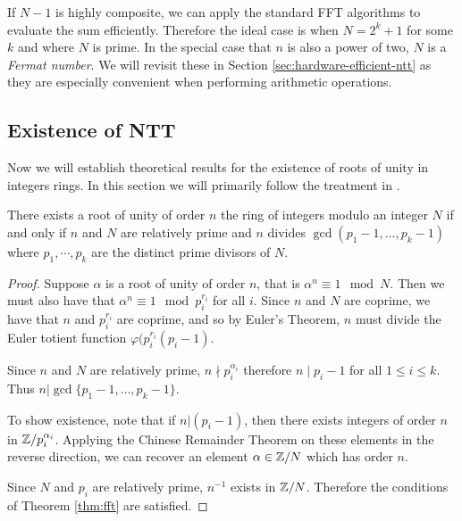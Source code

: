 If $N - 1$ is highly composite, we can apply the standard FFT algorithms to evaluate the sum efficiently. Therefore the ideal case is when $N = 2^k + 1$ for some $k$ and where $N$ is prime. In the special case that $n$ is also a power of two, $N$ is a \emph{Fermat number}. We will revisit these in Section \ref{sec:hardware-efficient-ntt} as they are especially convenient when performing arithmetic operations.

\subsection{Existence of NTT}%
\label{sub:Existence of NTT}

Now we will establish theoretical results for the existence of roots of unity in integers rings.
In this section we will primarily follow the treatment in \cite{intro-to-fmt}.

\begin{theorem}\label{thm:fmt-transform-length}

    There exists a root of unity of order $n$ the ring of integers modulo an integer $N$ if and only if $n$ and $N$ are relatively prime and $n$ divides $\gcd(p_1 - 1, \ldots, p_k - 1)$ where $p_1, \cdots, p_k$ are the distinct prime divisors of $N$.
\end{theorem}

\begin{proof}
    Suppose $\alpha$ is a root of unity of order $n$, that is $\alpha^n \equiv 1 \mod N$. Then we must also have that $\alpha^n \equiv 1 \mod p_i^{r_i}$ for all $i$. Since $n$ and $N$ are coprime, we have that $n$ and $p_i^{r_i}$ are coprime, and so by Euler's Theorem, $n$ must divide the Euler totient function $\varphi(p_i^{r_i}(p_i - 1)$.

    Since $n$ and $N$ are relatively prime, $n \nmid p_i^{\alpha_i}$ therefore $n \mid p_i - 1$ for all $1 \le i \le k$. Thus $n | \gcd\{p_1 - 1, \ldots, p_k - 1\}$.

    \medskip

    To show existence, note that if $n | (p_i - 1)$, then there exists integers of order $n$ in ${\mathbb Z}/p_i^{\alpha_i}$. Applying the Chinese Remainder Theorem on these elements in the reverse direction, we can recover an element $\alpha \in {\mathbb Z}/N$ which has order $n$.

    \medskip

    Since $N$ and $p_i$ are relatively prime, $n^{-1}$ exists in ${\mathbb Z}/N$. Therefore the conditions of Theorem \ref{thm:fft} are satisfied.
\end{proof}

